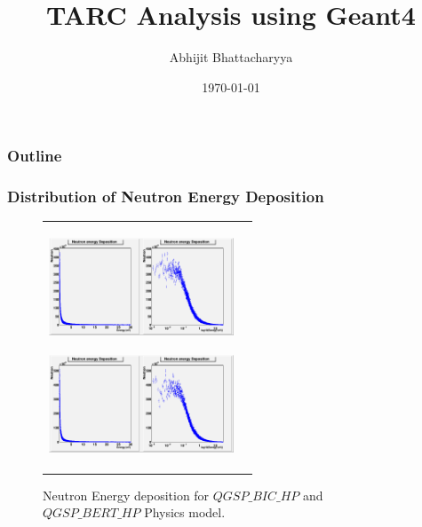 \documentclass{beamer}
\title{TARC Analysis using Geant4}
\author{Abhijit Bhattacharyya}
\institute{Bhabha Atomic Research Center \\ Mumbai INDIA}
\date{\today}
\begin{document}
    \begin{frame}
        \maketitle
    \end{frame}

    \begin{frame}
        \frametitle{Outline}
        \tableofcontents [part=1, pausesections]
    \end{frame}

    \begin{frame}
        \frametitle{Distribution of Neutron Energy Deposition}
        \begin{figure}
            \begin{tabular}{cc}
                \includegraphics[height=30mm, width=55mm]{../PICS/NeutEdepBIC.png}\label{fig:neutEdepBIC} 
                
                \includegraphics[height=30mm, width=55mm]{../PICS/NeutEdepBERT.png}
                \label{fig:neutEdepBERT} 
            \end{tabular}    
            \caption{Neutron Energy deposition for $QGSP\_BIC\_HP$ and $QGSP\_BERT\_HP$  Physics model.}
        \end{figure}
    \end{frame}
\end{document}
